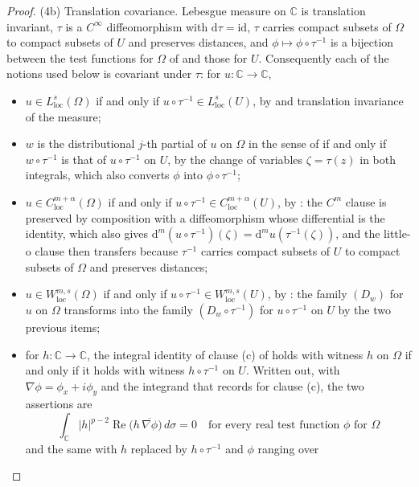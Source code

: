 \begin{proof}
\noindent(4b) Translation covariance.  Lebesgue measure on $\mathbb{C}$ is
translation invariant, $\tau$ is a $C^\infty$ diffeomorphism with
$\mathrm{d}\tau=\mathrm{id}$, $\tau$ carries compact subsets of $\Omega$ to
compact subsets of $U$ and preserves distances, and
$\phi\mapsto\phi\circ\tau^{-1}$ is a bijection between the test functions for
$\Omega$ of  and those for $U$.  Consequently each of the
notions used below is covariant under $\tau$: for $u\colon\mathbb{C}\to\mathbb{C}$,
\begin{itemize}
\item $u\in L^{s}_{\mathrm{loc}}(\Omega)$ if and only if
  $u\circ\tau^{-1}\in L^{s}_{\mathrm{loc}}(U)$, by
   and translation invariance of the measure;
\item $w$ is the distributional $j$-th partial of $u$ on $\Omega$ in the sense
  of  if and only if $w\circ\tau^{-1}$ is that of
  $u\circ\tau^{-1}$ on $U$, by the change of variables $\zeta=\tau(z)$ in both
  integrals, which also converts $\phi$ into $\phi\circ\tau^{-1}$;
\item $u\in C^{m+\alpha}_{\mathrm{loc}}(\Omega)$ if and only if
  $u\circ\tau^{-1}\in C^{m+\alpha}_{\mathrm{loc}}(U)$, by
  : the $C^m$ clause is preserved by composition with
  a diffeomorphism whose differential is the identity, which also gives
  $\mathrm{d}^m(u\circ\tau^{-1})(\zeta)=\mathrm{d}^mu(\tau^{-1}(\zeta))$, and
  the little-o clause then transfers because $\tau^{-1}$ carries compact
  subsets of $U$ to compact subsets of $\Omega$ and preserves distances;
\item $u\in W^{m,s}_{\mathrm{loc}}(\Omega)$ if and only if
  $u\circ\tau^{-1}\in W^{m,s}_{\mathrm{loc}}(U)$, by : the
  family $(D_w)$ for $u$ on $\Omega$ transforms into the family
  $(D_w\circ\tau^{-1})$ for $u\circ\tau^{-1}$ on $U$ by the two previous
  items;
\item for $h\colon\mathbb{C}\to\mathbb{C}$, the integral identity of clause (c)
  of  holds with witness $h$ on $\Omega$ if and only if it
  holds with witness $h\circ\tau^{-1}$ on $U$.  Written out, with
  $\nabla\phi=\phi_x+i\phi_y$ and the integrand that 
  records for clause (c), the two assertions are
  \[
    \int_{\mathbb{C}}|h|^{p-2}
      \operatorname{Re}\bigl(h\,\overline{\nabla\phi}\bigr)\,d\sigma=0
    \quad\text{for every real test function }\phi\text{ for }\Omega
  \]
  and the same with $h$ replaced by $h\circ\tau^{-1}$ and $\phi$ ranging over

\end{itemize}
\end{proof}
